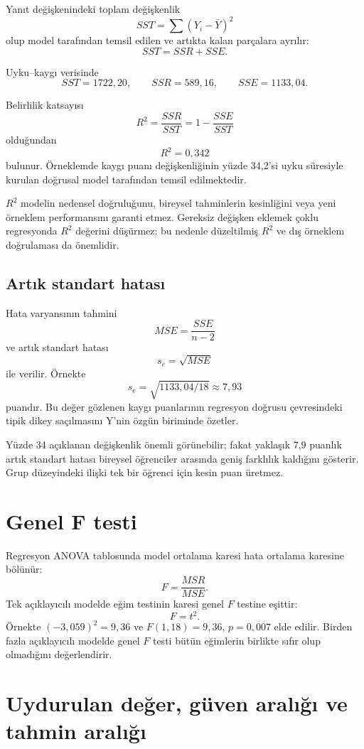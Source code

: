 Yanıt değişkenindeki toplam değişkenlik
\[
SST=\sum(Y_i-\bar Y)^2
\]
olup model tarafından temsil edilen ve artıkta kalan parçalara ayrılır:
\[
SST=SSR+SSE.
\]

Uyku--kaygı verisinde
\[
SST=1722{,}20,
\qquad SSR=589{,}16,
\qquad SSE=1133{,}04.
\]

Belirlilik katsayısı
\[
R^2=\frac{SSR}{SST}
=1-\frac{SSE}{SST}
\]
olduğundan
\[
R^2=0{,}342
\]
bulunur. Örneklemde kaygı puanı değişkenliğinin yüzde 34,2'si uyku süresiyle
kurulan doğrusal model tarafından temsil edilmektedir.

$R^2$ modelin nedensel doğruluğunu, bireysel tahminlerin kesinliğini veya yeni
örneklem performansını garanti etmez. Gereksiz değişken eklemek çoklu
regresyonda $R^2$ değerini düşürmez; bu nedenle düzeltilmiş $R^2$ ve dış
örneklem doğrulaması da önemlidir.

\subsection{Artık standart hatası}

Hata varyansının tahmini
\[
MSE=\frac{SSE}{n-2}
\]
ve artık standart hatası
\[
s_e=\sqrt{MSE}
\]
ile verilir. Örnekte
\[
s_e=\sqrt{1133{,}04/18}\approx7{,}93
\]
puandır. Bu değer gözlenen kaygı puanlarının regresyon doğrusu çevresindeki
tipik dikey saçılmasını Y'nin özgün biriminde özetler.

\begin{researchbox}
Yüzde 34 açıklanan değişkenlik önemli görünebilir; fakat yaklaşık 7,9 puanlık
artık standart hatası bireysel öğrenciler arasında geniş farklılık kaldığını
gösterir. Grup düzeyindeki ilişki tek bir öğrenci için kesin puan üretmez.
\end{researchbox}

\section{Genel F testi}

Regresyon ANOVA tablosunda model ortalama karesi hata ortalama karesine
bölünür:
\[
F=\frac{MSR}{MSE}.
\]
Tek açıklayıcılı modelde eğim testinin karesi genel $F$ testine eşittir:
\[
F=t^2.
\]
Örnekte $(-3{,}059)^2=9{,}36$ ve $F(1,18)=9{,}36$, $p=0{,}007$ elde edilir.
Birden fazla açıklayıcılı modelde genel $F$ testi bütün eğimlerin birlikte
sıfır olup olmadığını değerlendirir.

\section{Uydurulan değer, güven aralığı ve tahmin aralığı}

